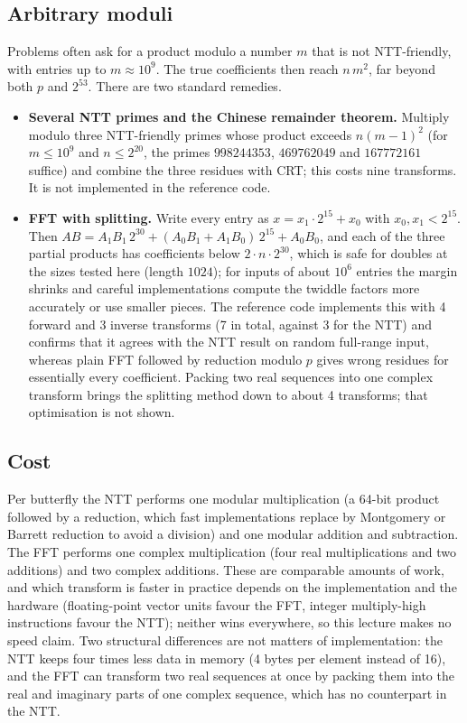\documentclass[11pt]{article}
\begin{document}
\subsection{Arbitrary moduli}
Problems often ask for a product modulo a number $m$ that is not NTT-friendly, with entries up to $m\approx10^9$. The true coefficients then reach $n\,m^2$, far beyond both $p$ and $2^{53}$.
There are two standard remedies.
\begin{itemize}[leftmargin=1.5em]
  \item \textbf{Several NTT primes and the Chinese remainder theorem.} Multiply modulo three NTT-friendly primes whose product exceeds $n(m-1)^2$ (for $m\le10^9$ and $n\le2^{20}$,
        the primes $998244353$, $469762049$ and $167772161$ suffice) and combine the three residues with CRT; this costs nine transforms. It is not implemented in the reference code.
  \item \textbf{FFT with splitting.} Write every entry as $x=x_1\cdot2^{15}+x_0$ with $x_0,x_1<2^{15}$. Then
        $AB=A_1B_1\,2^{30}+(A_0B_1+A_1B_0)\,2^{15}+A_0B_0$, and each of the three partial products has coefficients below $2\cdot n\cdot2^{30}$, which is safe for doubles at the sizes tested here (length $1024$); for inputs of about $10^6$ entries the margin shrinks and careful implementations compute the twiddle factors more accurately or use smaller pieces.
        The reference code implements this with 4 forward and 3 inverse transforms (7 in total, against 3 for the NTT) and confirms that it agrees with the NTT result on
        random full-range input, whereas plain FFT followed by reduction modulo $p$ gives wrong residues for essentially every coefficient. Packing two real sequences
        into one complex transform brings the splitting method down to about 4 transforms; that optimisation is not shown.
\end{itemize}

\subsection{Cost}
Per butterfly the NTT performs one modular multiplication (a 64-bit product followed by a reduction, which fast implementations replace by Montgomery or Barrett reduction to avoid a division)
and one modular addition and subtraction. The FFT performs one complex multiplication (four real multiplications and two additions) and two complex additions. These are comparable amounts of work,
and which transform is faster in practice depends on the implementation and the hardware (floating-point vector units favour the FFT, integer multiply-high instructions favour the NTT);
neither wins everywhere, so this lecture makes no speed claim. Two structural differences are not matters of implementation:
the NTT keeps four times less data in memory (4 bytes per element instead of 16), and the FFT can transform two real sequences at once by packing them into the real and imaginary parts of one complex sequence,
which has no counterpart in the NTT.
\end{document}
